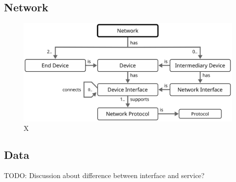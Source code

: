 \subsection{Network}

\begin{figure}[ht!]
  \centering
  \includegraphics{figures/network}
  \caption{
    X
  }
  \label{fig:network}
\end{figure}

\subsection{Data}

TODO: Discussion about difference between interface and service?
